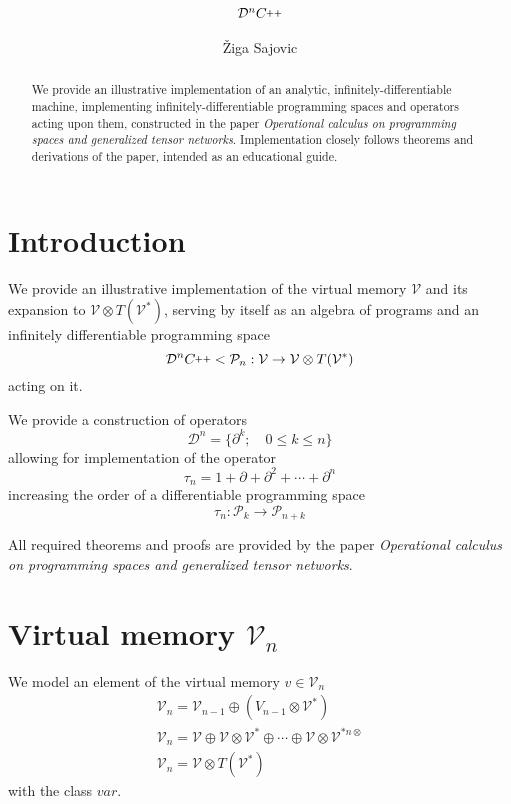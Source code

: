 \documentclass{article}
\title{$\DD^n\CC$}
\author{Žiga Sajovic}
\newcommand{\VV}{\mathcal{V}}
\newcommand{\CC}{C\nolinebreak\hspace{-.05em}\raisebox{.4ex}{\tiny\bf +}\nolinebreak\hspace{-.10em}\raisebox{.4ex}{\tiny\bf +}}
\def\CC{{C\nolinebreak[4]\hspace{-.05em}\raisebox{.4ex}{\tiny\bf ++}}}
\newcommand{\dP}{\mathcal{P}}
\newcommand{\D}{\partial}
\newcommand{\DD}{\mathcal{D}}
\newcommand{\sumd}{\tau}
\begin{document}
\maketitle

\begin{abstract}
We provide an illustrative implementation of an analytic, infinitely-differentiable machine, implementing infinitely-differentiable programming spaces and operators acting upon them, constructed in the paper \emph{Operational calculus on programming spaces and generalized tensor networks}. Implementation closely follows theorems and derivations of the paper, intended as an educational guide.
\end{abstract}

\tableofcontents

\section{Introduction}

We provide an illustrative implementation of the virtual memory $\VV$ and its expansion to $\VV\otimes T(\VV^*)$, serving by itself as an algebra of programs and an infinitely differentiable programming space
\begin{equation}
\DD^n\CC<\dP_n:\VV\to\VV\otimes T(\VV^*)
\end{equation}
acting on it.

We provide a construction of operators
\begin{equation}
\DD^n=\{\D^k;\quad 0\le k\le n\}
\end{equation}
allowing for implementation of the operator
\begin{equation}\label{eq:sumd}
\sumd_n=1+\D+\D^2+\cdots+\D^n
\end{equation}
increasing the order of a differentiable programming space
\begin{equation}
\sumd_n:\dP_k\to\dP_{n+k}
\end{equation}

All required theorems and proofs are provided by the paper \emph{Operational calculus on programming spaces and generalized tensor networks}.

\section{Virtual memory $\VV_n$}

We model an element of the virtual memory $v\in\VV_n$ 
\begin{eqnarray}
\VV_{n}=\VV_{n-1}\oplus(V_{n-1}\otimes\VV^*) \\
\VV_{n}=\VV\oplus\VV\otimes\VV^*\oplus\cdots\oplus\VV\otimes\VV^{*n\otimes}\\ \label{eq:V_n}
\VV_n=\VV\otimes T(\VV^*)
\end{eqnarray}
with the class $var$.
\end{document}
